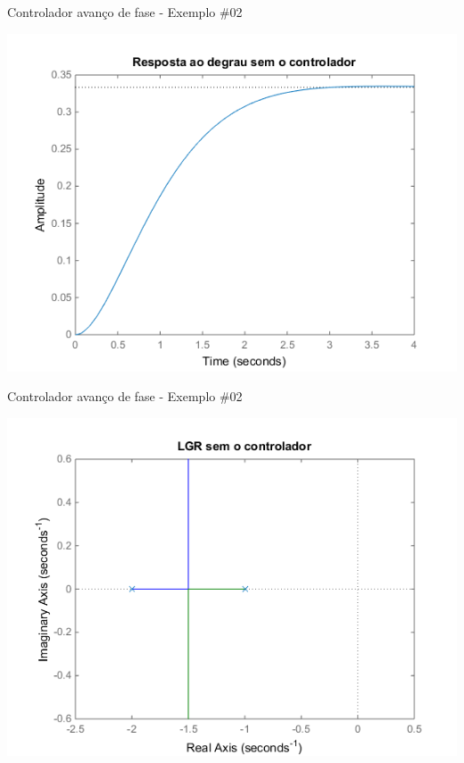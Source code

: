 \begin{frame}{Controlador avanço de fase - Exemplo \#02}
\centerline{\includegraphics[width=0.8\linewidth]{Figuras/Ch09/fig6.png}}
\end{frame}

\begin{frame}{Controlador avanço de fase - Exemplo \#02}
\centerline{\includegraphics[width=0.8\linewidth]{Figuras/Ch09/fig7.png}}
\end{frame}
            


